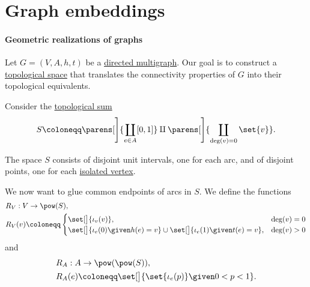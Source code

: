 \section{Graph embeddings}\label{sec:graph_embeddings}

\paragraph{Geometric realizations of graphs}

\begin{definition}\label{def:graph_geometric_realization}\mimprovised
  Let \( G = (V, A, h, t) \) be a \hyperref[def:directed_multigraph]{directed multigraph}. Our goal is to construct a \hyperref[def:topological_space]{topological space} that translates the connectivity properties of \( G \) into their topological equivalents.

  Consider the \hyperref[def:topological_sum]{topological sum}
  \begin{equation*}
    S \coloneqq \parens[\Bigg]{ \coprod_{e \in A} [0, 1] } \amalg \parens[\Bigg]{ \coprod_{\deg(v) = 0} \set{ v } }.
  \end{equation*}

  The space \( S \) consists of disjoint unit intervals, one for each arc, and of disjoint points, one for each \hyperref[def:graph_cardinality/directed_degree]{isolated vertex}.

  We now want to glue common endpoints of arcs in \( S \). We define the functions
  \begin{equation}\label{eq:def:graph_geometric_realization/rv}
    \begin{aligned}
      &R_V: V \to \pow(S), \\
      &R_V(v) \coloneqq \begin{cases}
        \set[\big]{ \iota_v(v) },                                                               &\deg(v) = 0 \\
        \set[\big]{ \iota_e(0) \given h(e) = v } \cup \set[\big]{ \iota_e(1) \given t(e) = v }, &\deg(v) > 0
      \end{cases}
    \end{aligned}
  \end{equation}
  and
  \begin{equation}\label{eq:def:graph_geometric_realization/ra}
    \begin{aligned}
      &R_A: A \to \pow(\pow(S)), \\
      &R_A(e) \coloneqq \set[\big]{ \set{ \iota_e(p) } \given 0 < p < 1 }.
    \end{aligned}
  \end{equation}


\end{definition}
